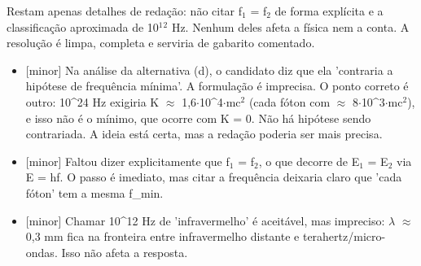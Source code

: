 \documentclass{article}%
\begin{document}
Restam apenas detalhes de redação: não citar f$_{1}$ = f$_{2}$ de forma explícita e a classificação aproximada de 10$^{1}$$^2$ Hz. Nenhum deles afeta a física nem a conta. A resolução é limpa, completa e serviria de gabarito comentado.%
\begin{itemize}%
\item%
{[}minor{]} Na análise da alternativa (d), o candidato diz que ela 'contraria a hipótese de frequência mínima'. A formulação é imprecisa. O ponto correto é outro: 10\^{}24 Hz exigiria K $\approx$ 1,6$\cdot$10\^{}4$\cdot$mc$^2$ (cada fóton com $\approx$ 8$\cdot$10\^{}3$\cdot$mc$^2$), e isso não é o mínimo, que ocorre com K = 0. Não há hipótese sendo contrariada. A ideia está certa, mas a redação poderia ser mais precisa.%
\item%
{[}minor{]} Faltou dizer explicitamente que f$_{1}$ = f$_{2}$, o que decorre de E$_{1}$ = E$_{2}$ via E = hf. O passo é imediato, mas citar a frequência deixaria claro que 'cada fóton' tem a mesma f\_min.%
\item%
{[}minor{]} Chamar 10\^{}12 Hz de 'infravermelho' é aceitável, mas impreciso: $\lambda$ $\approx$ 0,3 mm fica na fronteira entre infravermelho distante e terahertz/micro{-}ondas. Isso não afeta a resposta.%
\end{itemize}%
\end{document}
